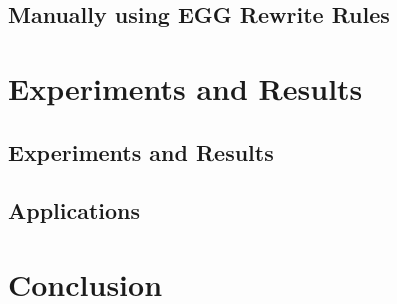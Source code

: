 \documentclass{article}
\begin{document}
\subsection{Manually using EGG Rewrite Rules}

\section{Experiments and Results}
\subsection{Experiments and Results}
\subsection{Applications}


\section{Conclusion}
\end{document}
